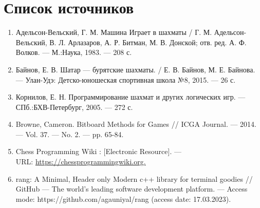 {
	\chapter*{Список источников}
	\begin{enumerate}
		\item Адельсон-Вельский, Г. М. Машина Играет в шахматы / Г. М. Адельсон-Вельский, В. Л. Арлазаров, А. Р. Битман, М. В. Донской; отв. ред. А. Ф. Волков. --- М.:Наука, 1983. --- 208 с.
		\item Байнов, Е. В. Шатар --- бурятские шахматы. / Е. В. Байнов, М. Е. Байнова. --- Улан-Удэ: Детско-юношеская спортивная школа №8, 2015. --- 26 с.
		\item Корнилов, Е. Н. Программирование шахмат и других логических игр. --- СПб.:БХВ-Петербург, 2005. --- 272 с. 
		\item Browne, Cameron. Bitboard Methods for Games // ICGA Journal. --- 2014. --- Vol. 37. --- No. 2. --- pp. 65-84.
		\item Chess Programming Wiki : [Electronic Resource]. --- \\URL: \href{https://chessprogrammingwiki.org}{https://chessprogrammingwiki.org.}
		\item rang: A Minimal, Header only Modern c++ library for terminal goodies // GitHub --- The world’s leading software development platform. --- Access mode: https://github.com/agauniyal/rang
		(access date: 17.03.2023).
	\end{enumerate}
	\clearpage
}